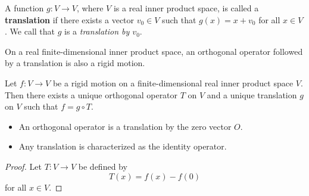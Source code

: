 \begin{definition}[Translations]
    A function \( g: V \to V  \), where \( V  \) is a real inner product space, is called a \textbf{translation} if there exists a vector \( {v}_{0} \in V  \) such that \( g(x) = x + {v}_{0} \) for all \( x \in V  \). We call that \( g  \) is a \textit{translation by \( {v}_{0} \)}. 
\end{definition}

    On a real finite-dimensional inner product space, an orthogonal operator followed by a translation is also a rigid motion.

\begin{theorem}
    Let \( f: V \to V  \) be a rigid motion on a finite-dimensional real inner product space \( V  \). Then there exists a unique orthogonal operator \( T  \) on \( V  \) and a unique translation \( g  \) on \( V  \) such that \( f  = g \circ T  \).
\end{theorem} 

\begin{itemize}
    \item An orthogonal operator is a translation by the zero vector \( O \).
    \item Any translation is characterized as the identity operator.
\end{itemize}

\begin{proof}
Let \( T: V \to V  \) be defined by 
\[  T(x) = f(x) - f(0) \]
for all \( x \in V  \).
\end{proof}

